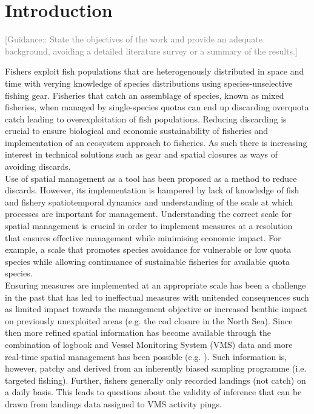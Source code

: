 \documentclass[review]{elsarticle}
\begin{document}
\linenumbers

\section{Introduction}

\textcolor{gray}{[Guidance:: State the objectives of the work and provide an 
adequate background, avoiding a detailed literature survey or a summary of the
results.] \\}

Fishers exploit fish populations that are heterogenously distributed in space
and time with verying knowledge of species distributions using
species-unselective fishing gear. Fisheries that catch an assemblage of
species, known as mixed fisheries, when managed by single-species quotas can
end up discarding overquota catch leading to overexploitation of fish
populations. Reducing discarding is crucial to ensure biological and economic
sustainability of fisheries and implementation of an ecosystem approach to
fisheries. As such there is increasing interest in technical solutions such as
gear and spatial closures as ways of avoiding discards.  \\

Use of spatial management as a tool has been proposed as a method to reduce
discards. However, its implementation is hampered by lack of knowledge of fish
and fishery spatiotemporal dynamics and understanding of the scale at which
processes are important for management. Understanding the correct scale for
spatial management is crucial in order to implement measures at a resolution
that ensures effective management\cite{Dunn2016} while minimising economic
impact. For example, a scale that promotes species avoidance for vulnerable or
low quota species while allowing continuance of sustainable fisheries for
available quota species. \\

Ensuring measures are implemented at an appropriate scale has been a challenge
in the past that has led to ineffectual measures with unitended consequences
such as limited impact towards the management objective or increased benthic
impact on previously unexploited areas (e.g. the cod closure in the North
Sea\cite{Rijnsdorp2001,Dinmore2003}). Since then more refined spatial
information has become available through the combination of logbook and Vessel
Monitoring System (VMS) data\cite{Lee2010, Bastardie2010, Gerritsen2012,
	Mateo2016} and more real-time spatial management has been possible 
	(e.g. \cite{Holmes2011}). Such information is, however, patchy and
derived from an inherently biased sampling programme (i.e. targeted fishing).
Further, fishers generally only recorded landings (not catch) on a daily basis.
This leads to questions about the validity of inference that can be drawn from
landings data assigned to VMS activity pings. \\ 
\end{document}
